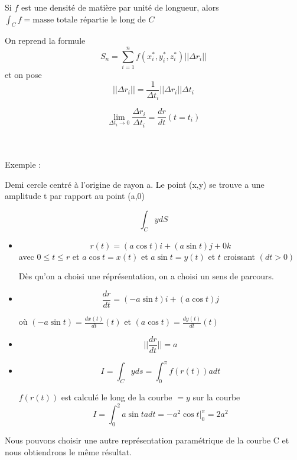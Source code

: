 \begin{myrem}
Si $f$ est une densité de matière par unité de longueur, alors $\int_C f  = \text{masse totale répartie le long de }C$
\end{myrem}

On reprend la formule
\[S_n=\sum_{i=1}^nf(x_i^*,y_i^*,z_i^*)||\Delta r_i||\]
 et on pose \[||\Delta r_i ||=\frac{1}{\Delta t_i}||\Delta r_i|| \Delta t_i\]


 \[\lim_{\Delta t_i \to 0} \frac{\Delta r_i}{\Delta t_i} = \frac{dr}{dt}(t=t_i)\]

 \\\\
 Exemple :

 Demi cercle centré à l'origine de rayon a. Le point (x,y) se trouve a une amplitude t par rapport au point (a,0)

 \[\int_C y dS\]

 \begin{itemize}

 \item
 \[r(t) = (a \cos t ) i + ( a \sin t )j +0k\]
avec $ 0\leqslant t \leqslant r $ et $a \cos t =x(t)$ et $a \sin t = y(t)$ et $t$ croissant $(dt>0)$

Dès qu'on a choisi une réprésentation, on a choisi un sens de parcours.
\item
\[\frac{dr}{dt}=(-a\sin t )i + (a \cos t ) j\]

 où $(-a\sin t ) = \frac{dx(t)}{dt}(t)$ et $(a\cos t ) = \frac{dy(t)}{dt}(t)$

\item $$||\frac{dr}{dt}||=a$$
\item $$I = \int_C y ds = \int_0^{\pi} f(r(t))adt$$

$f(r(t))$ est calculé le long de la courbe $= y$ sur la courbe
\[I=\int_0^2 a \sin t a dt = -a^2 \cos t \left. \right|^\pi_0=2a^2\]
 \end{itemize}

Nous pouvons choisir une autre représentation paramétrique de la courbe C et nous obtiendrons le même résultat.

